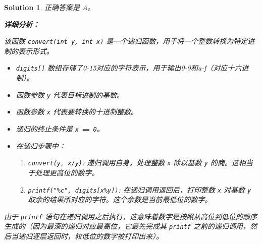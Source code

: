 \documentclass[UTF8]{report}
\newtheorem{solution}{Solution}
\theoremstyle{MyLineTheoremStyle} %
\theoremstyle{MyBlockTheoremStyle} %
\theoremstyle{MySubsubsectionStyle} %
\begin{document}
\begin{solution}
正确答案是 A。

\textbf{详细分析：}

该函数 \texttt{convert(int y, int x)} 是一个递归函数，用于将一个整数转换为特定进制的表示形式。
\begin{itemize}
    \item \texttt{digits[]} 数组存储了0-15对应的字符表示，用于输出0-9和a-f（对应十六进制）。
    \item 函数参数 \texttt{y} 代表目标进制的基数。
    \item 函数参数 \texttt{x} 代表要转换的十进制整数。
    \item 递归的终止条件是 \texttt{x == 0}。
    \item 在递归步骤中：
        \begin{enumerate}
            \item \texttt{convert(y, x/y)}: 递归调用自身，处理整数 \texttt{x} 除以基数 \texttt{y} 的商。这相当于处理更高位的数字。
            \item \texttt{printf("\%c", digits[x\%y])}: 在递归调用返回后，打印整数 \texttt{x} 对基数 \texttt{y} 取余的结果所对应的字符。这个余数是当前最低位的数字。
        \end{enumerate}
\end{itemize}
由于 \texttt{printf} 语句在递归调用之后执行，这意味着数字是按照从高位到低位的顺序生成的（因为最深的递归对应最高位，它最先完成其 \texttt{printf} 之前的递归调用，然后当递归逐层返回时，较低位的数字被打印出来）。



\end{solution}
\end{document}
